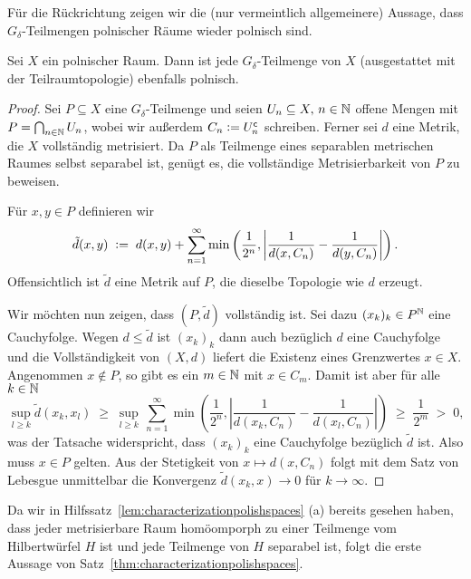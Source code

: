 \documentclass[../main/main.tex]{subfiles}
\begin{document}
	Für die Rückrichtung zeigen wir die (nur vermeintlich allgemeinere) Aussage, 
	dass $G_\delta$-Teilmengen polnischer Räume wieder polnisch sind.
	
	\begin{Hilfssatz}
		\label{lem:characterizationpolishspaces2}
		Sei $X$ ein polnischer Raum. Dann ist jede $G_\delta$-Teilmenge 
		von $X$ (ausgestattet mit der Teilraumtopologie) ebenfalls polnisch.
	\end{Hilfssatz}
	
	\begin{proof}
		Sei $P \subseteq X$ eine $G_\delta$-Teilmenge und seien 
		$U_n \subseteq X, \, n \in \mathbb{N}$ offene Mengen mit 
		$P = \bigcap_{n \in \mathbb{N}} U_n$, wobei wir außerdem 
		$C_n \vcentcolon = U_n^{\mathsf{c}}$ schreiben. Ferner sei 
		$d$ eine Metrik, die $X$ vollständig metrisiert. 
		Da $P$ als Teilmenge eines separablen metrischen Raumes 
		selbst separabel ist, genügt es, die vollständige Metrisierbarkeit 
		von $P$ zu beweisen.
		
		Für $x, y \in P$ definieren wir
		\[\tilde{d}(x, y) \; \vcentcolon = \; d(x, y) + \sum_{n=1}^{\infty} \min \left(
		\frac{1}{2^n}, \left| \frac{1}{d(x, C_n)} - \frac{1}{d(y, C_n)} \right|
		\right) \text{.}\]
		Offensichtlich ist $\tilde{d}$ eine Metrik auf $P$, 
		die dieselbe Topologie wie $d$ erzeugt. 
		
		Wir möchten nun zeigen, dass $(P, \tilde{d})$ vollständig ist. 
		Sei dazu $(x_k)_k \in P^{\mathbb{N}}$ eine Cauchyfolge. Wegen $d \leq \tilde{d}$ 
		ist $(x_k)_k$ dann auch bezüglich $d$ eine Cauchyfolge und die 
		Vollständigkeit von $(X, d)$ liefert die Existenz eines Grenzwertes 
		$x \in X$. Angenommen $x \notin P$, so gibt es ein $m \in \mathbb{N}$ mit 
		$x \in C_m$. Damit ist aber für alle $k \in \mathbb{N}$
		$$\sup_{l \geq k} \tilde{d}(x_k, x_l) \; \geq \; \sup_{l \geq k} 
		\, \sum_{n=1}^{\infty} \min \left(
		\frac{1}{2^n}, \left| \frac{1}{d(x_k, C_n)} -
		\frac{1}{d(x_l, C_n)} \right|
		\right) \; \geq \; \frac{1}{2^m} \; > \; 0 \text{,}$$
		was der Tatsache widerspricht, dass $(x_k)_k$ eine Cauchyfolge 
		bezüglich $\tilde{d}$ ist. Also muss $x \in P$ gelten. 
		Aus der Stetigkeit von $x \mapsto d(x, C_n)$ folgt mit dem 
		Satz von Lebesgue unmittelbar die Konvergenz 
		$\tilde{d}(x_k, x) \to 0$ für $k \to \infty$.
	\end{proof}
	
	Da wir in Hilfssatz~\ref{lem:characterizationpolishspaces} (a) bereits 
	gesehen haben, dass jeder metrisierbare  Raum homöomporph zu einer 
	Teilmenge vom Hilbertwürfel $H$ ist und jede Teilmenge von $H$ separabel ist,
	folgt die erste Aussage von Satz~\ref{thm:characterizationpolishspaces}. 
	
\end{document}
